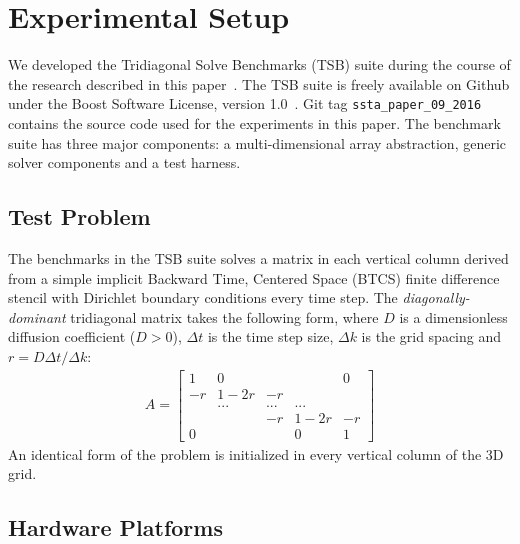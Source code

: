 \documentclass{sig-alternate-05-2015}
\begin{document}
\section{Experimental Setup}
\label{sec:experimental_setup:}
We developed the Tridiagonal Solve Benchmarks (TSB) suite during the course of
  the research described in this paper~\cite{tsb_git}.
The TSB suite is freely available on Github under the Boost Software License,
  version 1.0~\cite{boost_license}.
Git tag \lstinline{ssta_paper_09_2016} contains the source code used for the
  experiments in this paper.
The benchmark suite has three major components: a multi-dimensional array
  abstraction, generic solver components and a test harness.

\subsection{Test Problem}
\label{sec:experimental_setup:test_problem}

The benchmarks in the TSB suite solves a matrix in each vertical column derived
  from a simple implicit Backward Time, Centered Space (BTCS) finite difference
  stencil with Dirichlet boundary conditions every time step.
The \emph{diagonally-dominant} tridiagonal matrix takes the following form,
  where \(D\) is a dimensionless diffusion coefficient (\(D > 0\)), \(\Delta t\)
  is the time step size, \(\Delta k\) is the grid spacing and
  \(r=D \Delta t / \Delta k\):
\begin{align*}
A = 
\begin{bmatrix}
1   & 0      &     &        & 0  \\
-r  & 1 - 2r & -r  &        &    \\
    & ...    & ... & ...    &    \\
    &        & -r  & 1 - 2r & -r \\
0   &        &     & 0      & 1
\end{bmatrix}  
\end{align*}
An identical form of the problem is initialized in every vertical column of the
  3D grid.

\subsection{Hardware Platforms}
\label{sec:experimental_setup:hardware_platforms}
\end{document}
